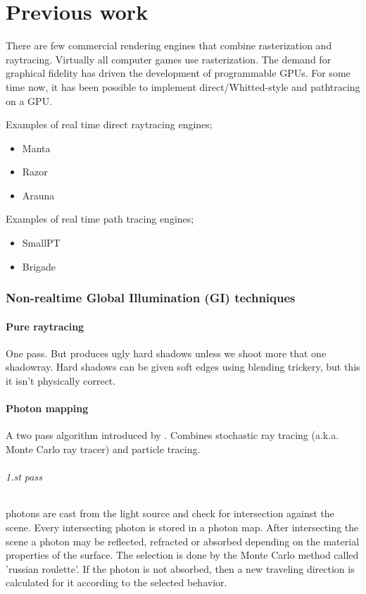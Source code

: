 \part{Previous work}

There are few commercial rendering engines that combine rasterization and raytracing. Virtually all computer games use rasterization. The demand for graphical fidelity has driven the development of programmable GPUs. For some time now, it has been possible to implement direct/Whitted-style and pathtracing on a GPU.

Examples of real time direct raytracing engines; 
\begin{itemize}
	\item Manta
	\item Razor
	\item Arauna
\end{itemize}

Examples of real time path tracing engines; 
\begin{itemize}
	\item SmallPT
	\item Brigade
\end{itemize}

\section {Non-realtime Global Illumination (GI) techniques}
		\subsection{Pure raytracing} 
		One pass. But produces ugly hard shadows unless we shoot more that one shadowray. Hard shadows can be given soft edges using blending trickery, but this it isn't physically correct.
		
	\subsection{Photon mapping} A two pass algorithm introduced by \cite{jensen95}. Combines stochastic ray tracing (a.k.a. Monte Carlo ray tracer) and particle tracing.
	\paragraph{1.st pass} photons are cast from the light source and check for intersection against the scene.    Every intersecting photon is stored in a photon map. After intersecting the scene a photon may be reflected, refracted or absorbed depending on the material properties of the surface. The selection is done by the Monte Carlo method called 'russian roulette'. If the photon is not absorbed, then a new traveling direction is calculated for it according to the selected behavior.

